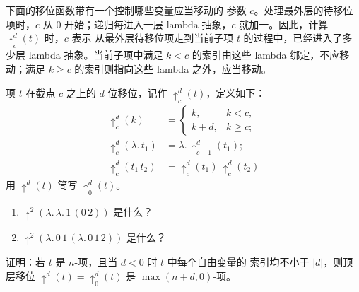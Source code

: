 下面的移位函数带有一个控制哪些变量应当移动的
参数 \(c\)。处理最外层的待移位项时，\(c\) 从 \(0\) 开始；递归每进入一层
lambda 抽象，\(c\) 就加一。因此，计算 \(\uparrow^d_c(t)\) 时，\(c\) 表示
从最外层待移位项走到当前子项 \(t\) 的过程中，已经进入了多少层 lambda
抽象。当前子项中满足 \(k<c\) 的索引由这些 lambda 绑定，不应移动；满足
\(k\geq c\) 的索引则指向这些 lambda 之外，应当移动。

\begin{definition}[移位]
\label{def:6.2.1}
项 \(t\) 在截点 \(c\) 之上的 \(d\) 位移位，记作
\(\uparrow^d_c(t)\)，定义如下：
\[
\begin{aligned}
 \uparrow^d_c(k)
   &=
   \begin{cases}
     k,   & k<c,\\
     k+d, & k\geq c;
   \end{cases}\\
 \uparrow^d_c(\lambda.\,t_1)
   &=\lambda.\,\uparrow^d_{c+1}(t_1);\\
 \uparrow^d_c(t_1\,t_2)
   &=\uparrow^d_c(t_1)\ \uparrow^d_c(t_2)
\end{aligned}
\]
用 \(\uparrow^d(t)\) 简写 \(\uparrow^d_0(t)\)。
\end{definition}


\begin{exercise}[\(\star\)]
\label{ex:6.2.2}
\begin{enumerate}
  \item \(\uparrow^2(\lambda.\,\lambda.\,1\,(0\,2))\) 是什么？
  \item \(\uparrow^2(\lambda.\,0\,1\,(\lambda.\,0\,1\,2))\) 是什么？
\end{enumerate}
\end{exercise}

\begin{exercise}[\(\star\star,\nrightarrow\)]
\label{ex:6.2.3}
证明：若 \(t\) 是 \(n\)-项，且当 \(d<0\) 时 \(t\) 中每个自由变量的
索引均不小于 \(|d|\)，则顶层移位
\(\uparrow^d(t)=\uparrow^d_0(t)\) 是
\(\max(n+d,0)\)-项。
\end{exercise}


